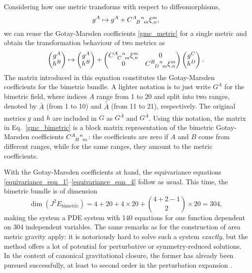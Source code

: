 Considering how one metric transforms with respect to diffeomorphisms,
\begin{equation}
  g^A \mapsto g^A + \gmc{A}{B}{n}{m}\xi^m_{,n},
\end{equation}
we can reuse the Gotay-Marsden coefficients \eqref{gmc_metric} for a single metric and obtain the transformation behaviour of two metrics as
\begin{equation}\label{gmc_bimetric}
  \begin{pmatrix}g^A \\ h^B\end{pmatrix} \mapsto \begin{pmatrix}g^A \\ h^B\end{pmatrix} + \begin{pmatrix}\gmc{A}{C}{n}{m}\xi^m_{,n} & 0 \\ 0 & \gmc{B}{D}{n}{m}\xi^m_{,n}\end{pmatrix} \begin{pmatrix}g^C \\ h^D\end{pmatrix}.
\end{equation}
The matrix introduced in this equation constitutes the Gotay-Marsden coefficients for the bimetric bundle. A lighter notation is to just write $G^A$ for the bimetric field, where indices $A$ range from 1 to 20 and split into two ranges, denoted by $\bar A$ (from 1 to 10) and $\bar{\bar A}$ (from 11 to 21), respectively. The original metrics $g$ and $h$ are included in $G$ as $G^{\bar A}$ and $G^{\bar{\bar A}}$. Using this notation, the matrix in Eq.~\ref{gmc_bimetric} is a block matrix representation of the bimetric Gotay-Marsden coefficients $\gmc{A}{B}{n}{m}$: the coefficients are zero if $A$ and $B$ come from different ranges, while for the same ranges, they amount to the metric coefficients.

With the Gotay-Marsden coefficients at hand, the equivariance equations \eqref{equivariance_eqn_1}--\eqref{equivariance_eqn_4} follow as usual. This time, the bimetric bundle is of dimension
\begin{equation}
  \operatorname{dim}(J^2E_\text{bimetric}) = 4 + 20 + 4\times 20 + \binom{4 + 2 - 1}{2}\times 20 = 304,
\end{equation}
making the system a PDE system with 140 equations for one function dependent on 304 independent variables. The same remarks as for the construction of area metric gravity apply: it is notoriously hard to solve such a system \emph{exactly}, but the method offers a lot of potential for perturbative or symmetry-reduced solutions. In the context of canonical gravitational closure, the former has already been pursued successfully, at least to second order in the perturbation expansion \cite{Wierzba_2018,Beier_2018}.

